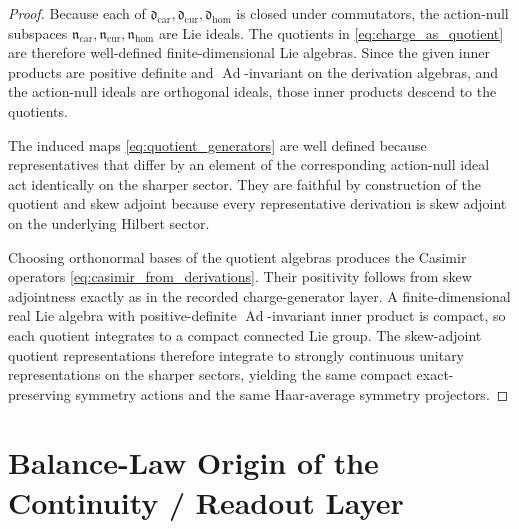\documentclass[11pt]{article}
\newcommand{\TensorDerAlg}{\mathfrak d_{\mathrm{car}}}
\newcommand{\CurDerAlg}{\mathfrak d_{\mathrm{cur}}}
\newcommand{\HomDerAlg}{\mathfrak d_{\mathrm{hom}}}
\newcommand{\TensorActNull}{\mathfrak n_{\mathrm{car}}}
\newcommand{\CurActNull}{\mathfrak n_{\mathrm{cur}}}
\newcommand{\HomActNull}{\mathfrak n_{\mathrm{hom}}}
\begin{document}
\begin{proof}
Because each of \(\TensorDerAlg,\CurDerAlg,\HomDerAlg\) is closed under commutators, the action-null subspaces \(\TensorActNull,\CurActNull,\HomActNull\) are Lie ideals. The quotients in \eqref{eq:charge_as_quotient} are therefore well-defined finite-dimensional Lie algebras. Since the given inner products are positive definite and \(\operatorname{Ad}\)-invariant on the derivation algebras, and the action-null ideals are orthogonal ideals, those inner products descend to the quotients.

The induced maps \eqref{eq:quotient_generators} are well defined because representatives that differ by an element of the corresponding action-null ideal act identically on the sharper sector. They are faithful by construction of the quotient and skew adjoint because every representative derivation is skew adjoint on the underlying Hilbert sector.

Choosing orthonormal bases of the quotient algebras produces the Casimir operators \eqref{eq:casimir_from_derivations}. Their positivity follows from skew adjointness exactly as in the recorded charge-generator layer. A finite-dimensional real Lie algebra with positive-definite \(\operatorname{Ad}\)-invariant inner product is compact, so each quotient integrates to a compact connected Lie group. The skew-adjoint quotient representations therefore integrate to strongly continuous unitary representations on the sharper sectors, yielding the same compact exact-preserving symmetry actions and the same Haar-average symmetry projectors.
\end{proof}

\section{Balance-Law Origin of the Continuity / Readout Layer}
\end{document}
